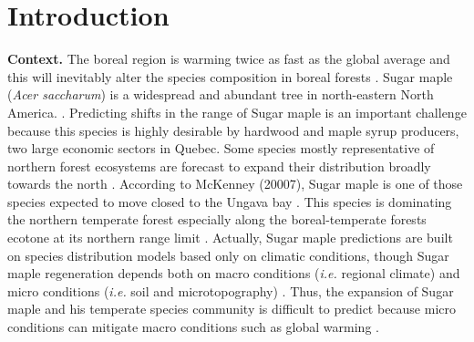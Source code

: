 


\newpage
\setcounter{page}{1}

\section{Introduction}

\textbf{Context.}  The boreal region is warming twice as fast as the global
average and  this will inevitably alter the species composition in boreal
forests \cite{Scheffer2012,Hughes2000,Lafleur2010}. Sugar maple (\textit{Acer
saccharum}) is a widespread and abundant tree in north-eastern North America.
\cite{Graignic2013,Messaoud2007,Kellman2004,Barras1998}. Predicting shifts in
the range of Sugar maple is an important challenge because this species is
highly desirable by hardwood and maple syrup producers, two large economic
sectors in Quebec. Some species mostly representative of northern forest
ecosystems are forecast to expand their distribution broadly towards the north
\cite{Sciences2014,Iverson2002}. According to McKenney (20007), Sugar maple is
one of those species expected to move closed to the Ungava bay
\cite{Sciences2014}. This species is dominating the northern temperate forest
especially along the boreal-temperate forests ecotone at its northern range
limit \cite{Barras1998}. Actually, Sugar maple predictions are built on species
distribution models based only on climatic conditions, though Sugar maple
regeneration depends both on macro conditions (\textit{i.e.} regional climate)
and micro conditions (\textit{i.e.} soil and microtopography)
\cite{Graignic2013,Lafleur2010}. Thus, the expansion of Sugar maple and his
temperate species community is difficult to predict because micro conditions can
mitigate macro conditions such as global warming \cite{DeFrenne2013}.\\

